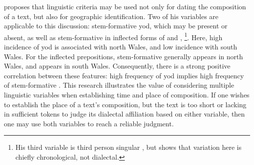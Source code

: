 
\Textcite{Tho_Middle93} proposes that linguistic criteria may be used not only for dating the composition of a text, but also for geographic identification. Two of his variables are applicable to this discussion:  stem-formative yod, which may be present or absent, \eg {} as well as stem-formative  in inflected forms of  and , \eg {}\footnote{His third variable is third person singular , but \textcite{Rod_Datable98}  shows that variation here is chiefly chronological, not dialectal.}. Here, high incidence of yod is associated with north Wales, and low incidence with south Wales. For the inflected prepositions, stem-formative  generally appears in north Wales, and  appears in south Wales. Consequently, there is a strong positive correlation between these features: high frequency of yod implies high frequency of stem-formative . This research illustrates the value of considering multiple linguistic variables when establishing time and place of composition. If one wishes to establish the place of a text's composition, but the text is too short or lacking in sufficient tokens to judge its dialectal affiliation based on either variable, then one may use both variables to reach a reliable judgment.

